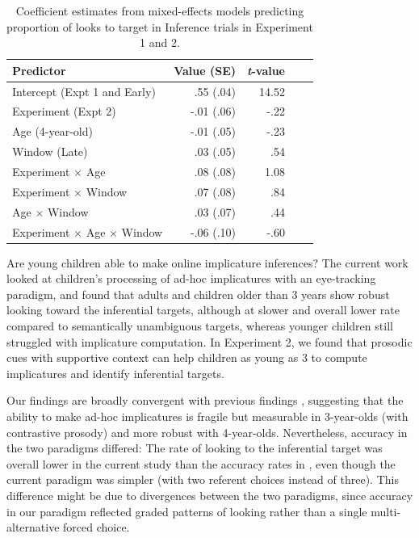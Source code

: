 \documentclass[10pt,letterpaper]{article}
\begin{document}
\begin{table}[b!]
\caption{\label{tab:lmer4}  Coefficient estimates from mixed-effects models predicting proportion of looks to target in Inference trials in Experiment 1 and 2.} 
\begin{center} 
\begin{tabular}{l r r r l} 
\hline
Predictor  &  Value (SE) & \emph{t}-value\\
\hline
Intercept (Expt 1 and Early)  & .55 (.04) & 14.52 \\
Experiment (Expt 2)  & -.01 (.06) &  -.22 \\
Age (4-year-old) & -.01 (.05) &  -.23 \\
Window (Late) & .03 (.05) & .54 \\
Experiment $\times$  Age & .08 (.08) & 1.08 \\
Experiment $\times$  Window & .07 (.08) & .84 \\
Age $\times$  Window & .03 (.07) & .44 \\
Experiment $\times$ Age $\times$ Window & -.06 (.10) & -.60 \\
\hline
\end{tabular} 
\end{center} 
\end{table}

Are young children able to make online implicature inferences? The current work looked at children's processing of ad-hoc implicatures with an eye-tracking paradigm, and found that adults and children older than 3 years show robust looking toward the inferential targets, although at slower and overall lower rate compared to semantically unambiguous targets, whereas younger children still struggled with implicature computation. In Experiment 2, we found that prosodic cues with supportive context can help children as young as 3 to compute implicatures and identify inferential targets.

Our findings are broadly convergent with previous findings \cite{stillerLLD}, suggesting that the ability to make ad-hoc implicatures is fragile but measurable in 3-year-olds (with contrastive prosody) and more robust with 4-year-olds. Nevertheless, accuracy in the two paradigms differed: The rate of looking to the inferential target was overall lower in the current study than the accuracy rates in , even though the current paradigm was simpler (with two referent choices instead of three). This difference might be due to divergences between the two paradigms, since accuracy in our paradigm reflected graded patterns of looking rather than a single multi-alternative forced choice. 
\end{document}
